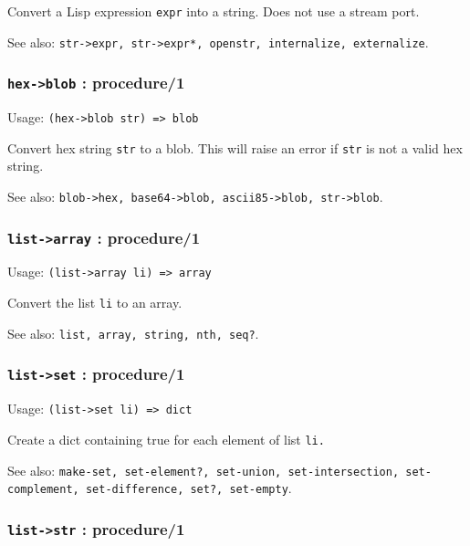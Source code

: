 \documentclass[
]{article}
\newcommand{\passthrough}[1]{#1}
\begin{document}
Convert a Lisp expression \passthrough{\lstinline!expr!} into a string.
Does not use a stream port.

See also:
\passthrough{\lstinline!str->expr, str->expr*, openstr, internalize, externalize!}.

\hypertarget{hex-blob-procedure1}{%
\subsubsection{\texorpdfstring{\texttt{hex-\textgreater{}blob} :
procedure/1}{hex-\textgreater blob : procedure/1}}\label{hex-blob-procedure1}}

Usage: \passthrough{\lstinline!(hex->blob str) => blob!}

Convert hex string \passthrough{\lstinline!str!} to a blob. This will
raise an error if \passthrough{\lstinline!str!} is not a valid hex
string.

See also:
\passthrough{\lstinline!blob->hex, base64->blob, ascii85->blob, str->blob!}.

\hypertarget{list-array-procedure1}{%
\subsubsection{\texorpdfstring{\texttt{list-\textgreater{}array} :
procedure/1}{list-\textgreater array : procedure/1}}\label{list-array-procedure1}}

Usage: \passthrough{\lstinline!(list->array li) => array!}

Convert the list \passthrough{\lstinline!li!} to an array.

See also: \passthrough{\lstinline!list, array, string, nth, seq?!}.

\hypertarget{list-set-procedure1}{%
\subsubsection{\texorpdfstring{\texttt{list-\textgreater{}set} :
procedure/1}{list-\textgreater set : procedure/1}}\label{list-set-procedure1}}

Usage: \passthrough{\lstinline!(list->set li) => dict!}

Create a dict containing true for each element of list
\passthrough{\lstinline!li.!}

See also:
\passthrough{\lstinline!make-set, set-element?, set-union, set-intersection, set-complement, set-difference, set?, set-empty!}.

\hypertarget{list-str-procedure1}{%
\subsubsection{\texorpdfstring{\texttt{list-\textgreater{}str} :
procedure/1}{list-\textgreater str : procedure/1}}\label{list-str-procedure1}}
\end{document}
